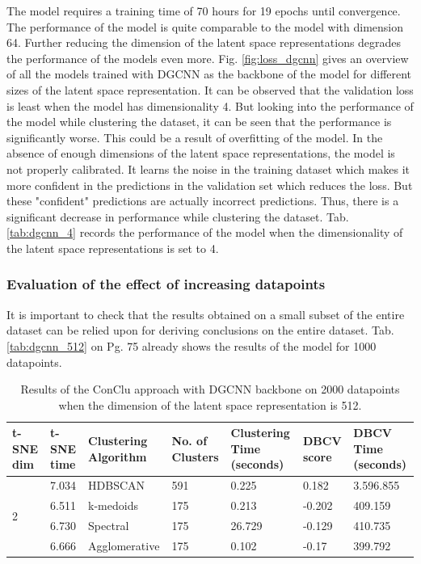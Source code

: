 The model requires a training time of 70 hours for 19 epochs until convergence. The performance of the model is quite comparable to the model with dimension 64. Further reducing the dimension of the latent space representations degrades the performance of the models even more. Fig. \ref{fig:loss_dgcnn} gives an overview of all the models trained with \ac{DGCNN} as the backbone of the model for different sizes of the latent space representation. It can be observed that the validation loss is least when the model has dimensionality 4. But looking into the performance of the model while clustering the dataset, it can be seen that the performance is significantly worse. This could be a result of overfitting of the model. In the absence of enough dimensions of the latent space representations, the model is not properly calibrated. It learns the noise in the training dataset which makes it more confident in the predictions in the validation set which reduces the loss. But these "confident" predictions are actually incorrect predictions. Thus, there is a significant decrease in performance while clustering the dataset. Tab. \ref{tab:dgcnn_4} records the performance of the model when the dimensionality of the latent space representations is set to 4. 

\subsubsection{Evaluation of the effect of increasing datapoints} 
It is important to check that the results obtained on a small subset of the entire dataset can be relied upon for deriving conclusions on the entire dataset. Tab. \ref{tab:dgcnn_512} on Pg. 75 already shows the results of the model for 1000 datapoints.
\begin{table}[H]
  \setlength\extrarowheight{10pt}
  \caption{Results of the ConClu approach with \ac{DGCNN} backbone on 2000 datapoints when the dimension of the latent space representation is 512.}
  \centering
  \begin{tabular}{|p{30pt}|p{50pt}|p{60pt}|p{50pt}|p{50pt}|p{50pt}|p{40pt}|}
    \toprule
    \ac{t-SNE} dim	& \ac{t-SNE} time & Clustering Algorithm & No. of Clusters & Clustering Time (seconds) & \ac{DBCV} score & \ac{DBCV} Time (seconds)\\
    \midrule
    \multirow{4}{30pt}{2}	& 7.034	& \ac{HDBSCAN}	& 591	& 0.225	& 0.182	& 3.596.855 \\ \cline{2-7} 
    & 6.511	& k-medoids	& 175	& 0.213	& -0.202	& 409.159 \\ \cline{2-7} 
    & 6.730	& Spectral	& 175	& 26.729	& -0.129	& 410.735 \\ \cline{2-7}
    & 6.666	& Agglomerative	& 175	& 0.102	& -0.17	& 399.792 \\ 
    \bottomrule
  \end{tabular}
  \label{tab:dgcnn_2000}
\end{table}

